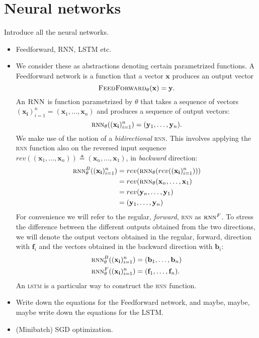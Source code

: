 \section{Neural networks}
Introduce all the neural networks.
\begin{itemize}
  \item Feedforward, RNN, LSTM etc.
  \item We consider these as abstractions denoting certain parametrized functions. A Feedforward network is a function that a vector $\mathbf{x}$ produces an output vector
  \begin{equation*}
    \textsc{FeedForward}_{\theta}( \mathbf{x} ) = \mathbf{y}.
  \end{equation*}
  An $\textsc{RNN}$ is function parametrized by $\theta$ that takes a sequence of vectors $(\mathbf{x_i})_{i=1}^n = ( \mathbf{x}_1, \dots, \mathbf{x}_n )$  and produces a sequence of output vectors:
  \begin{equation*}
    \textsc{rnn}_{\theta}( (\mathbf{x_i})_{i=1}^n ) = ( \mathbf{y}_1, \dots, \mathbf{y}_n ).
  \end{equation*}
  We make use of the notion of a \textit{bidirectional} \textsc{rnn}. This involves applying the \textsc{rnn} function also on the reversed input sequence $rev((\mathbf{x}_1, \dots, \mathbf{x}_n)) \triangleq (\mathbf{x}_n, \dots, \mathbf{x}_1)$, \ie in \textit{backward} direction:
  \begin{align*}
    \textsc{rnn}_{\theta}^B( (\mathbf{x_i})_{i=1}^n )
      &= rev(\textsc{rnn}_{\theta}(rev((\mathbf{x_i})_{i=1}^n))) \\
      &= rev(\textsc{rnn}_{\theta}(\mathbf{x}_n, \dots, \mathbf{x}_1) \\
      &= rev( \mathbf{y}_n, \dots, \mathbf{y}_1 ) \\
      &= ( \mathbf{y}_1, \dots, \mathbf{y}_n ) \\
  \end{align*}
  For convenience we will refer to the regular, \textit{forward}, \textsc{rnn} as $\textsc{rnn}^F$. To stress the difference between the different outputs obtained from the two directions, we will denote the output vectors obtained in the regular, forward, direction with $\mathbf{f}_i$ and the vectors obtained in the backward direction with $\mathbf{b}_i$:
  \begin{align*}
    \textsc{rnn}_{\theta}^B( (\mathbf{x_i})_{i=1}^n ) &= ( \mathbf{b}_1, \dots, \mathbf{b}_n ) \\
    \textsc{rnn}_{\theta}^F( (\mathbf{x_i})_{i=1}^n ) &= ( \mathbf{f}_1, \dots, \mathbf{f}_n ).
  \end{align*}
  An \textsc{lstm} is a particular way to construct the \textsc{rnn} function.
  \item Write down the equations for the Feedforward network, and maybe, maybe, maybe write down the equations for the LSTM.
  \item (Minibatch) SGD optimization.
\end{itemize}

